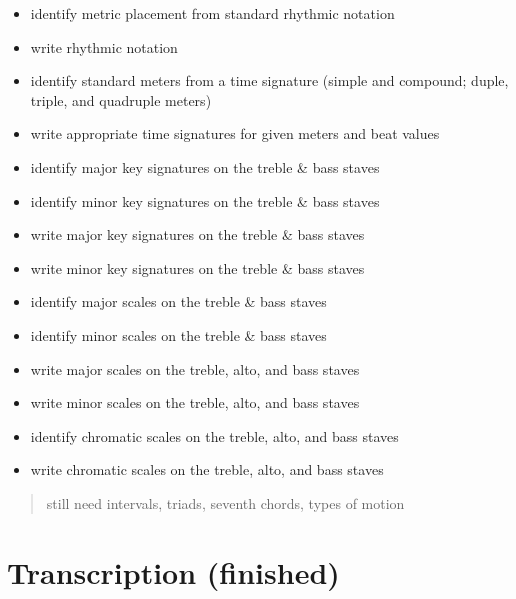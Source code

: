 \begin{itemize}
\item identify metric placement from standard rhythmic notation

\item write rhythmic notation

\item identify standard meters from a time signature (simple and compound; duple, triple, and quadruple meters)

\item write appropriate time signatures for given meters and beat values

\item identify major key signatures on the treble \& bass staves

\item identify minor key signatures on the treble \& bass staves

\item write major key signatures on the treble \& bass staves

\item write minor key signatures on the treble \& bass staves

\item identify major scales on the treble \& bass staves

\item identify minor scales on the treble \& bass staves

\item write major scales on the treble, alto, and bass staves

\item write minor scales on the treble, alto, and bass staves

\item identify chromatic scales on the treble, alto, and bass staves

\item write chromatic scales on the treble, alto, and bass staves

\end{itemize}

\begin{quote}

still need intervals, triads, seventh chords, types of motion
\end{quote}

\section{Transcription (finished)}
\label{transcriptionfinished}

